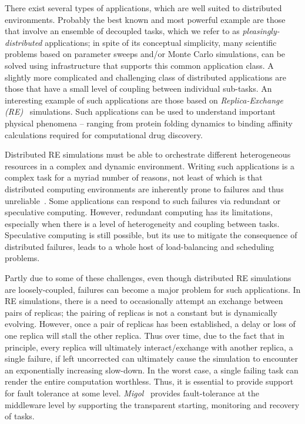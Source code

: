 \documentclass{rspublic}
\begin{document}
There exist several types of applications, which are well suited
to distributed environments. Probably the best known and most powerful
example are those that involve an ensemble of decoupled tasks, which
we refer to as {\it pleasingly-distributed} applications; in spite of
its conceptual simplicity, many scientific problems based on parameter
sweeps and/or Monte Carlo simulations, can be solved using
infrastructure that supports this common application class. A slightly
more complicated and challenging class of distributed applications are
those that have a small level of coupling between individual
sub-tasks.  An interesting example of such applications are those
based on \emph{Replica-Exchange (RE)}~\citep{hansmann,Sugita:1999rm}
simulations.  Such applications can be used to understand important
physical phenomena -- ranging from protein folding dynamics to binding
affinity calculations required for computational drug discovery.

Distributed RE simulations must be able to orchestrate different
heterogeneous resources in a complex and dynamic environment.  Writing
such applications is a complex task for a myriad number of reasons,
not least of which is that distributed computing environments are
inherently prone to failures and thus
unreliable~\citep{schroeder,10.1109/E-SCIENCE.2006.93,DBLP:conf/grid/KhaliliHOSC06}.
Some applications can respond to such failures via redundant or
speculative computing.  However, redundant computing has its
limitations, especially when there is a level of heterogeneity and
coupling between tasks.  Speculative computing is still possible, but
its use to mitigate the consequence of distributed failures, leads to
a whole host of load-balancing and scheduling problems.

Partly due to some of these challenges, even though distributed RE
simulations are loosely-coupled, failures can become a major problem
for such applications.  In RE simulations, there is a need to
occasionally attempt an exchange between pairs of replicas; the
pairing of replicas is not a constant but is dynamically evolving.
However, once a pair of replicas has been established, a delay or loss
of one replica will stall the other replica.  Thus over time, due to
the fact that in principle, every replica will ultimately
interact/exchange with another replica, a single failure, if left
uncorrected can ultimately cause the simulation to encounter an
exponentially increasing slow-down.  In the worst case, a single
failing task can render the entire computation worthless.  Thus, it is
essential to provide support for fault tolerance at some level.
\emph{Migol}~\citep{schnorLuckow08} provides fault-tolerance at the
middleware level by supporting the transparent starting, monitoring
and recovery of tasks.
\end{document}

